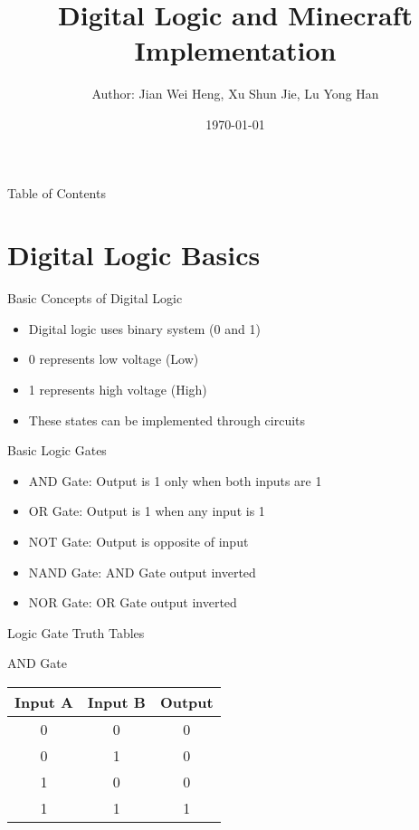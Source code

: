 \documentclass{beamer}
\title{Digital Logic and Minecraft Implementation}
\author{Author: Jian Wei Heng, Xu Shun Jie, Lu Yong Han}
\institute{Fu Jen Catholic University}
\date{\today}
\begin{document}
\begin{frame}
    \titlepage
\end{frame}

\begin{frame}{Table of Contents}
    \tableofcontents
\end{frame}

\section{Digital Logic Basics}
\begin{frame}{Basic Concepts of Digital Logic}
    \begin{itemize}
        \item Digital logic uses binary system (0 and 1)
        \item 0 represents low voltage (Low)
        \item 1 represents high voltage (High)
        \item These states can be implemented through circuits
    \end{itemize}
\end{frame}

\begin{frame}{Basic Logic Gates}
    \begin{itemize}
        \item AND Gate: Output is 1 only when both inputs are 1
        \item OR Gate: Output is 1 when any input is 1
        \item NOT Gate: Output is opposite of input
        \item NAND Gate: AND Gate output inverted
        \item NOR Gate: OR Gate output inverted
    \end{itemize}
\end{frame}

\begin{frame}{Logic Gate Truth Tables}
    \begin{block}{AND Gate}
        \begin{tabular}{|c|c|c|}
            \hline
            Input A & Input B & Output \\
            \hline
            0 & 0 & 0 \\
            0 & 1 & 0 \\
            1 & 0 & 0 \\
            1 & 1 & 1 \\
            \hline
        \end{tabular}
    \end{block}
\end{frame}
\end{document}
